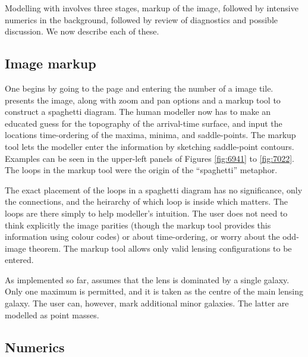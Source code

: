 Modelling with \spl involves three stages, markup of the image,
followed by intensive numerics in the background, followed by review
of diagnostics and possible discussion.  We now describe each of
these.

\subsection{Image markup}

One begins by going to the \spl page and entering the number of a \sw
image tile.  \spl presents the image, along with zoom and pan options
and a markup tool to construct a spaghetti diagram.  The human
modeller now has to make an educated guess for the topography of the
arrival-time surface, and input the locations time-ordering of the
maxima, minima, and saddle-points.  The markup tool \citep[which is
  inspired by Figure~6 of][and is like that figure made interactive
  and overlaid on data]{1986ApJ...310..568B} lets the modeller enter
the information by sketching saddle-point contours.  Examples can be
seen in the upper-left panels of Figures \ref{fig:6941} to
\ref{fig:7022}.  The loops in the markup tool were the origin of the
``spaghetti'' metaphor.

The exact placement of the loops in a spaghetti diagram has no
significance, only the connections, and the heirarchy of which loop is
inside which matters.  The loops are there simply to help modeller's
intuition.  The user does not need to think explicitly the image
parities (though the markup tool provides this information using
colour codes) or about time-ordering, or worry about the odd-image
theorem.  The markup tool allows only valid lensing configurations to
be entered.

As implemented so far, \spl assumes that the lens is dominated by a
single galaxy.  Only one maximum is permitted, and it is taken as the
centre of the main lensing galaxy.  The user can, however, mark
additional minor galaxies.  The latter are modelled as point
masses.

\subsection{Numerics}

